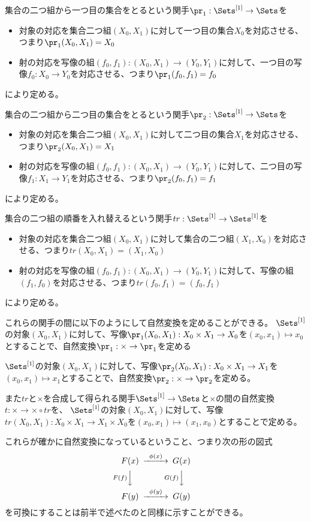 \documentclass[uplatex]{jsarticle}
\begin{document}
集合の二つ組から一つ目の集合をとるという関手$\pr_1:\Sets^{[1]} \to \Sets$を
\begin{itemize}
\item 対象の対応を集合二つ組$(X_0,X_1)$に対して一つ目の集合$X_0$を対応させる、つまり$\pr_1(X_0,X_1)=X_0$
\item 射の対応を写像の組$(f_0,f_1):(X_0,X_1) \to (Y_0,Y_1)$に対して、一つ目の写像$f_0:X_0\to Y_0$を対応させる、つまり$\pr_1(f_0,f_1)=f_0$
\end{itemize}
により定める。

集合の二つ組から二つ目の集合をとるという関手$\pr_2:\Sets^{[1]} \to \Sets$を
\begin{itemize}
\item 対象の対応を集合二つ組$(X_0,X_1)$に対して二つ目の集合$X_1$を対応させる、つまり$\pr_2(X_0,X_1)=X_1$
\item 射の対応を写像の組$(f_0,f_1):(X_0,X_1) \to (Y_0,Y_1)$に対して、二つ目の写像$f_1:X_1\to Y_1$を対応させる、つまり$\pr_2(f_0,f_1)=f_1$
\end{itemize}
により定める。

集合の二つ組の順番を入れ替えるという関手$tr:\Sets^{[1]} \to \Sets^{[1]}$を
\begin{itemize}
\item 対象の対応を集合二つ組$(X_0,X_1)$に対して集合の二つ組$(X_1,X_0)$を対応させる、つまり$tr(X_0,X_1)=(X_1,X_0)$
\item 射の対応を写像の組$(f_0,f_1):(X_0,X_1) \to (Y_0,Y_1)$に対して、写像の組$(f_1,f_0)$を対応させる、つまり$tr(f_0,f_1)=(f_0,f_1)$
\end{itemize}
により定める。

これらの関手の間に以下のようにして自然変換を定めることができる。
$\Sets^{[1]}$の対象$(X_0, X_1)$に対して、写像$\pr_1(X_0,X_1):X_0 \times X_1 \to X_0$を$(x_0, x_1) \mapsto x_0$とすることで、自然変換$\pr_1:\times \to \pr_1$を定める

$\Sets^{[1]}$の対象$(X_0, X_1)$に対して、写像$\pr_2(X_0,X_1):X_0 \times X_1 \to X_1$を$(x_0, x_1) \mapsto x_1$とすることで、自然変換$\pr_2:\times \to \pr_2$を定める。

また$tr$と$\times$を合成して得られる関手$\Sets^{[1]} \to \Sets$と$\times$の間の自然変換$t:\times \to \times \circ tr$を、
$\Sets^{[1]}$の対象$(X_0, X_1)$に対して、写像$tr(X_0,X_1):X_0 \times X_1 \to X_1 \times X_0$を$(x_0, x_1) \mapsto (x_1,x_0)$とすることで定める。

これらが確かに自然変換になっているということ、つまり次の形の図式
\[
\begin{CD}
F(x)@>\phi(x)>>G(x)\\
@VF(f)VV@VG(f)VV\\
F(y)@>\phi(y)>>G(y)
\end{CD}
\]
を可換にすることは前半で述べたのと同様に示すことができる。
\end{document}
